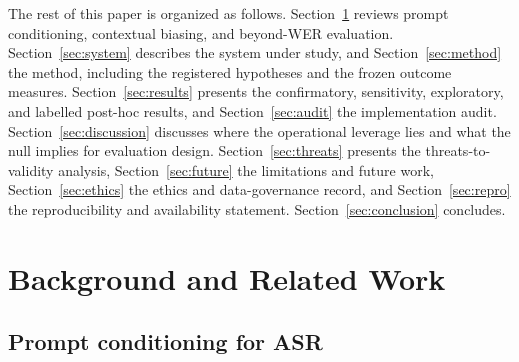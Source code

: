 \documentclass[11pt]{article}
\begin{document}
The rest of this paper is organized as follows. Section~\ref{sec:related} reviews prompt conditioning, contextual biasing, and beyond-WER evaluation. Section~\ref{sec:system} describes the system under study, and Section~\ref{sec:method} the method, including the registered hypotheses and the frozen outcome measures. Section~\ref{sec:results} presents the confirmatory, sensitivity, exploratory, and labelled post-hoc results, and Section~\ref{sec:audit} the implementation audit. Section~\ref{sec:discussion} discusses where the operational leverage lies and what the null implies for evaluation design. Section~\ref{sec:threats} presents the threats-to-validity analysis, Section~\ref{sec:future} the limitations and future work, Section~\ref{sec:ethics} the ethics and data-governance record, and Section~\ref{sec:repro} the reproducibility and availability statement. Section~\ref{sec:conclusion} concludes.

\section{Background and Related Work}
\label{sec:related}

\subsection{Prompt conditioning for ASR}
\end{document}
